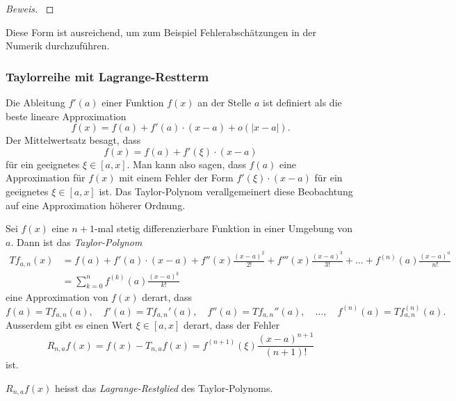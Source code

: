 \begin{proof}[Beweis]
\cite[(8.5.1)]{buch:dieudonne}
\end{proof}

Diese Form ist ausreichend, um zum Beispiel Fehlerabschätzungen in der
Numerik durchzuführen.

\subsubsection{Taylorreihe mit Lagrange-Restterm}
Die Ableitung $f'(a)$ einer Funktion $f(x)$ an der Stelle $a$ ist definiert
als die beste lineare Approximation
\[
f(x) = f(a) + f'(a)\cdot (x-a) + o(|x-a|).
\]
Der Mittelwertsatz besagt, dass
\[
f(x) = f(a) + f'(\xi) \cdot (x-a)
\]
für ein geeignetes $\xi\in[a,x]$.
Man kann also sagen, dass $f(a)$ eine Approximation für $f(x)$ mit einem
Fehler der Form $f'(\xi)\cdot(x-a)$ für ein geeignetes $\xi\in[a,x]$ ist.
Das Taylor-Polynom verallgemeinert diese Beobachtung auf eine Approximation
höherer Ordnung.

\begin{satz}
Sei $f(x)$ eine $n+1$-mal stetig differenzierbare Funktion in einer
Umgebung von $a$.
Dann ist das {\em Taylor-Polynom}
\begin{align*}
Tf_{a,n}(x)
&=
f(a) + f'(a)\cdot (x-a) + f''(x)\frac{(x-a)^2}{2!} + f'''(x)\frac{(x-a)^3}{3!}
+\dots+f^{(n)}(a)\frac{(x-a)^n}{n!}
\\
&=
\sum_{k=0}^n
f^{(k)}(a) \frac{(x-a)^k}{k!}
\end{align*}
eine Approximation von $f(x)$ derart, dass
\[
f(a)=Tf_{a,n}(a),\quad
f'(a)=Tf_{a,n}'(a),\quad
f''(a)=Tf_{a,n}''(a),\quad
\dots,\quad
f^{(n)}(a)=Tf_{a,n}^{(n)}(a).
\]
Ausserdem gibt es einen Wert $\xi\in[a,x]$ derart, dass der Fehler
\[
R_{n,a}f(x)
=
f(x) - T_{n,a}f(x)
=
f^{(n+1)}(\xi)\frac{(x-a)^{n+1}}{(n+1)!}
\]
ist.
\end{satz}
$R_{n,a}f(x)$ heisst das {\em Lagrange-Restglied} des Taylor-Polynoms.

